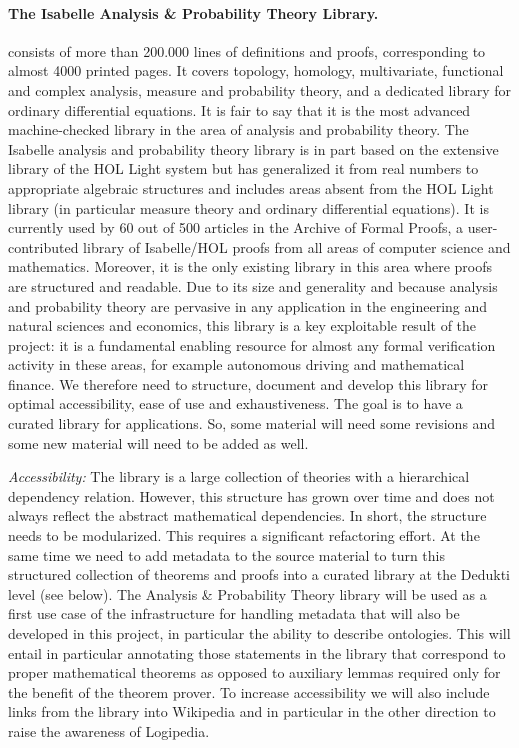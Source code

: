 \paragraph*{The Isabelle Analysis \& Probability Theory Library.}
consists of more
than 200.000 lines of definitions and proofs, corresponding to almost
4000 printed pages. It covers topology, homology, multivariate,
functional and complex analysis, measure and probability theory, and a
dedicated library for ordinary differential equations. It is fair to
say that it is the most advanced machine-checked library in the area
of analysis and probability theory. The Isabelle analysis and
probability theory library is in part based on the extensive library
of the HOL Light system but has generalized it from real numbers to
appropriate algebraic structures and includes areas absent from the
HOL Light library (in particular measure theory and ordinary
differential equations). It is currently used by 60 out of 500
articles in the Archive of Formal Proofs, a user-contributed library
of Isabelle/HOL proofs from all areas of computer science and
mathematics. Moreover, it is the only existing library in this area
where proofs are structured and readable. Due to its size and
generality and because analysis and probability theory are pervasive
in any application in the engineering and natural sciences and
economics, this library is a key exploitable result of the project: it
is a fundamental enabling resource for almost any formal verification
activity in these areas, for example autonomous driving and
mathematical finance. We therefore need to structure,
document and develop this library for optimal accessibility, ease of
use and exhaustiveness. The goal is to have a curated library for
applications. So, some material will need some revisions
and some new material will need to be added as well.

\emph{Accessibility:}
The library is a large collection of theories with a hierarchical dependency
relation. However, this structure has grown over time and does not always
reflect the abstract mathematical dependencies. In short, the structure needs
to be modularized. This requires a significant refactoring effort.
%
At the same time we need to add metadata to the source material to
turn this structured collection of theorems and proofs into a curated
library at the Dedukti level (see below). The Analysis \& Probability
Theory library will be used as a first use case of the infrastructure
for handling metadata that will also be developed in this project, in
particular the ability to describe ontologies.  This will entail in
particular annotating those statements in the library that correspond
to proper mathematical theorems as opposed to auxiliary lemmas
required only for the benefit of the theorem prover.  To increase
accessibility we will also include links from the library into
Wikipedia and in particular in the other direction to raise the
awareness of Logipedia.

